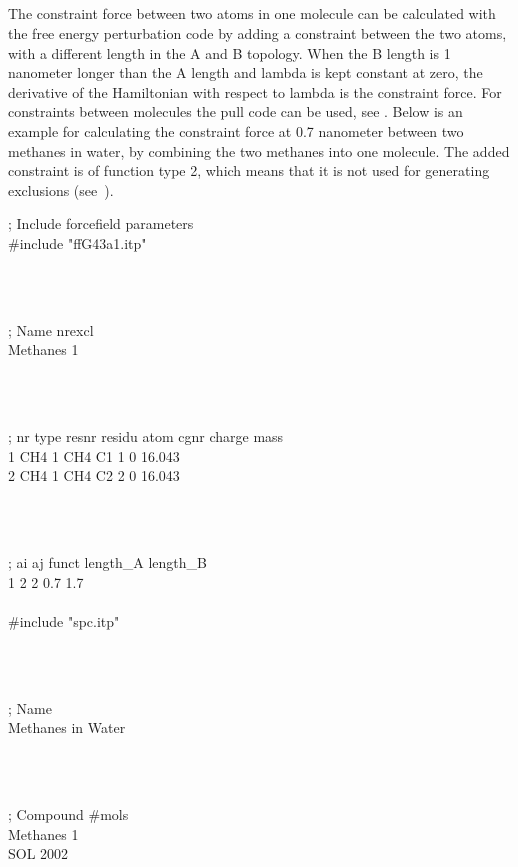 \subsection{}
\label{subsec:constraintforce}
The constraint force between two atoms in one molecule can be calculated
with the free energy perturbation code by adding a constraint between the
two atoms, with a different length in the A and B topology. When the B length
is 1 nanometer longer than the A length and lambda is kept constant at zero,
the derivative of the Hamiltonian with respect to lambda is the constraint
force. For constraints between molecules the pull code can be used,
see .
Below is an example for calculating the constraint force at 0.7 nanometer
between two methanes in water, by combining the two methanes into one molecule.
The added constraint is of function type 2, which means that it is not
used for generating exclusions (see~).

\begin{tt}
; Include forcefield parameters\\
\#include "ffG43a1.itp"\\
\end{tt}\\
\begin{tt}
[ moleculetype ]\\
; Name            nrexcl\\
Methanes               1\\
\end{tt}\\
\begin{tt}
[ atoms ]\\
; nr   type   resnr  residu   atom    cgnr     charge    mass\\
   1    CH4     1     CH4      C1       1          0    16.043\\
   2    CH4     1     CH4      C2       2          0    16.043\\
\end{tt}\\
\begin{tt}
[ constraints ]\\
;  ai    aj funct   length\_A  length\_B\\
    1     2     2        0.7       1.7\\
\\
\#include "spc.itp"\\
\end{tt}\\
\begin{tt}
[ system ]\\
; Name\\
Methanes in Water\\
\end{tt}\\
\begin{tt}
[ molecules ]\\
; Compound        \#mols\\
Methanes              1\\
SOL                2002\\
\end{tt}

